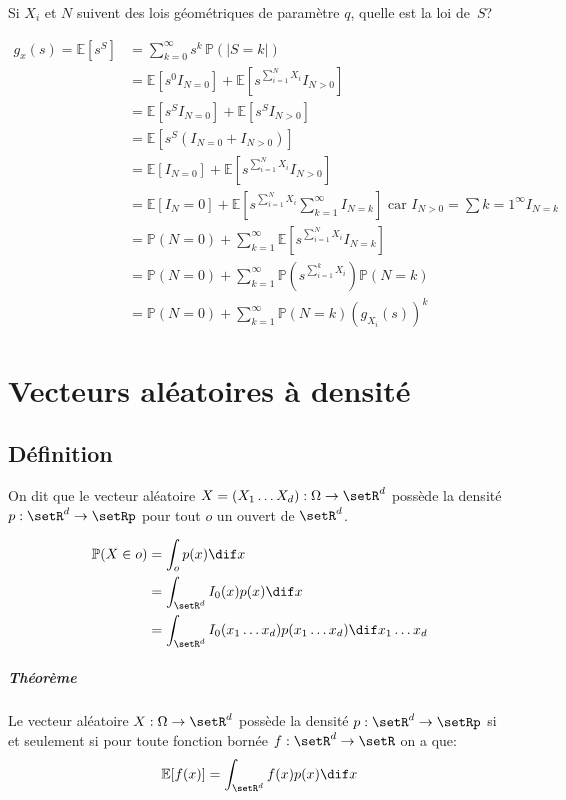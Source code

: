 \documentclass[a4paper,10pt,french,openany]{memoir}
\newcommand{\Proba}{\mathbb{P}}
\newcommand{\Esper}{\mathbb{E}}
\newcommand{\abs}[1]{\lvert #1 \rvert}
\newcommand{\xoned}{x_1\dots x_d}
\newcommand{\Xoned}{X_1\dots X_d}
\begin{document}
Si $X_i$ et $N$ suivent des lois géométriques de paramètre $q$, quelle est la loi de~$S$?

\begin{align*}
 g_x(s) = \Esper\left[s^S\right] &= \sum_{k=0}^\infty s^k\,\Proba\left(\abs{S=k}\right) \\
 &= \Esper\left[s^0 I_{N=0}\right] + \Esper\left[s^{\sum_{i=1}^N X_i} I_{N>0}\right] \\
 &= \Esper\left[s^S I_{N=0}\right] + \Esper\left[s^S I_{N>0}\right] \\
 &= \Esper\left[s^S (I_{N=0} + I_{N>0})\right] \\
 &= \Esper[I_{N=0}] + \Esper\left[s^{\sum_{i=1}^N X_i} I_{N>0}\right] \\
 &= \Esper[I_N=0] + \Esper\left[s^{\sum_{i=1}^N X_i} \sum_{k=1}^\infty I_{N=k}\right] \text{ car } I_{N>0}=\sum{k=1}^\infty I_{N=k} \\
 &= \Proba(N=0) + \sum_{k=1}^\infty \Esper\left[s^{\sum_{i=1}^N X_i} I_{N=k}\right] \\
 &= \Proba(N=0) + \sum_{k=1}^\infty \Proba\left(s^{\sum_{i=1}^k X_i}\right) \Proba(N=k) \\
 &= \Proba(N=0) + \sum_{k=1}^\infty \Proba(N=k) (g_{X_i} (s))^k
\end{align*}

\chapter{Vecteurs aléatoires à densité}

\section{Définition}

On dit que le vecteur aléatoire $X = (\Xoned): \Omega \rightarrow \setR^d$ possède la densité $p: \setR^d \rightarrow \setRp$ pour tout $o$ un ouvert de $\setR^d$.

\begin{align*}
 \Proba(X\in o) &= \int_o p(x) \dif x \\
 &= \int_{\setR^d} I_0(x) p(x) \dif x \\
 &= \int_{\setR^d} I_0(\xoned) p(\xoned) \dif \xoned
\end{align*}

\paragraph{Théorème}
Le vecteur aléatoire $X:\Omega \rightarrow \setR^d$ possède la densité $p:\setR^d \rightarrow \setRp$ si et seulement si pour toute fonction bornée $f:\setR^d \rightarrow \setR$ on a que: \[\Esper[f(x)]=\int_{\setR^d}f(x)p(x) \dif x\]
\end{document}
